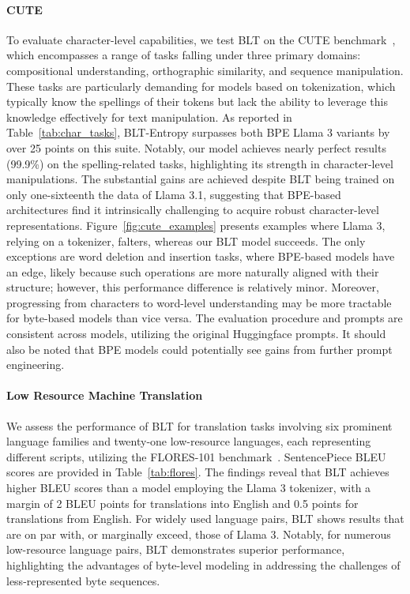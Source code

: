 \paragraph{CUTE}
To evaluate character-level capabilities, we test {\textsc BLT} on the CUTE benchmark~\citep{edman2024cute}, which encompasses a range of tasks falling under three primary domains: compositional understanding, orthographic similarity, and sequence manipulation. These tasks are particularly demanding for models based on tokenization, which typically know the spellings of their tokens but lack the ability to leverage this knowledge effectively for text manipulation. As reported in Table~\ref{tab:char_tasks}, {\textsc BLT}-Entropy surpasses both BPE Llama 3 variants by over 25 points on this suite. Notably, our model achieves nearly perfect results (99.9\%) on the spelling-related tasks, highlighting its strength in character-level manipulations. The substantial gains are achieved despite {\textsc BLT} being trained on only one-sixteenth the data of Llama 3.1, suggesting that BPE-based architectures find it intrinsically challenging to acquire robust character-level representations. Figure~\ref{fig:cute_examples} presents examples where Llama 3, relying on a tokenizer, falters, whereas our {\textsc BLT} model succeeds. The only exceptions are word deletion and insertion tasks, where BPE-based models have an edge, likely because such operations are more naturally aligned with their structure; however, this performance difference is relatively minor. Moreover, progressing from characters to word-level understanding may be more tractable for byte-based models than vice versa. The evaluation procedure and prompts are consistent across models, utilizing the original Huggingface prompts. It should also be noted that BPE models could potentially see gains from further prompt engineering.

\paragraph{Low Resource Machine Translation} We assess the performance of {\textsc BLT} for translation tasks involving six prominent language families and twenty-one low-resource languages, each representing different scripts, utilizing the FLORES-101 benchmark~\citep{goyal2022flores}. SentencePiece BLEU scores are provided in Table~\ref{tab:flores}. The findings reveal that {\textsc BLT} achieves higher BLEU scores than a model employing the Llama 3 tokenizer, with a margin of 2 BLEU points for translations into English and 0.5 points for translations from English. For widely used language pairs, {\textsc BLT} shows results that are on par with, or marginally exceed, those of Llama 3. Notably, for numerous low-resource language pairs, {\textsc BLT} demonstrates superior performance, highlighting the advantages of byte-level modeling in addressing the challenges of less-represented byte sequences.

